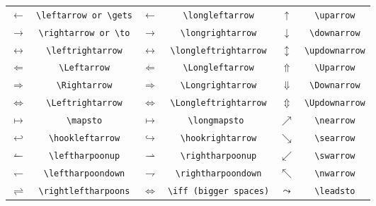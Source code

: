 \begin{table}[H]
\centering
\begin{tabular}{*{6}{c}}
$\leftarrow $ & \verb|\leftarrow or \gets| &$\longleftarrow $ & \verb|\longleftarrow| &$\uparrow $ & \verb|\uparrow| \\
$\rightarrow $ & \verb|\rightarrow or \to| &$ \longrightarrow$ & \verb|\longrightarrow| &$ \downarrow$ & \verb|\downarrow| \\
$\leftrightarrow $ & \verb|\leftrightarrow| &$\longleftrightarrow $ & \verb|\longleftrightarrow| &$\updownarrow $ & \verb|\updownarrow| \\
$ \Leftarrow$ & \verb|\Leftarrow| &$\Longleftarrow $ & \verb|\Longleftarrow| &$\Uparrow $ & \verb|\Uparrow| \\
$\Rightarrow $ & \verb|\Rightarrow| &$\Longrightarrow $ & \verb|\Longrightarrow| &$ \Downarrow$ & \verb|\Downarrow| \\
$\Leftrightarrow $ & \verb|\Leftrightarrow| &$ \Longleftrightarrow$ & \verb|\Longleftrightarrow| &$ \Updownarrow$ & \verb|\Updownarrow| \\
$\mapsto $ & \verb|\mapsto| &$\longmapsto  $ & \verb|\longmapsto | &$\nearrow $ & \verb|\nearrow| \\
$\hookleftarrow $ & \verb|\hookleftarrow| &$\hookrightarrow $ & \verb|\hookrightarrow| &$ \searrow$ & \verb|\searrow| \\
$ \leftharpoonup$ & \verb|\leftharpoonup| &$\rightharpoonup $ & \verb|\rightharpoonup| &$\swarrow $ & \verb|\swarrow| \\
$\leftharpoondown$ & \verb|\leftharpoondown| &$ \rightharpoondown$ & \verb|\rightharpoondown| &$\nwarrow $ & \verb|\nwarrow| \\
$\rightleftharpoons $ & \verb|\rightleftharpoons| &$ \iff$ & \verb|\iff (bigger spaces)| &$\leadsto $ & \verb|\leadsto|\hyperlink{latexsym}{\footnotemark[1]} \\

\end{tabular}
\end{table}




